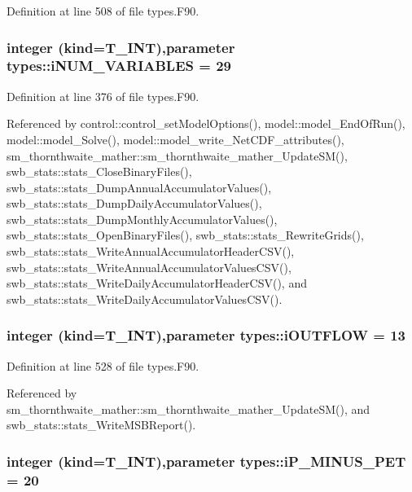 Definition at line 508 of file types.F90.

\hypertarget{namespacetypes_a9fd35718050c56c63e14d03fb07b62b3}{
\subsubsection[{iNUM\_\-VARIABLES}]{\setlength{\rightskip}{0pt plus 5cm}integer (kind={\bf T\_\-INT}),parameter {\bf types::iNUM\_\-VARIABLES} = 29}}
\label{namespacetypes_a9fd35718050c56c63e14d03fb07b62b3}


Definition at line 376 of file types.F90.



Referenced by control::control\_\-setModelOptions(), model::model\_\-EndOfRun(), model::model\_\-Solve(), model::model\_\-write\_\-NetCDF\_\-attributes(), sm\_\-thornthwaite\_\-mather::sm\_\-thornthwaite\_\-mather\_\-UpdateSM(), swb\_\-stats::stats\_\-CloseBinaryFiles(), swb\_\-stats::stats\_\-DumpAnnualAccumulatorValues(), swb\_\-stats::stats\_\-DumpDailyAccumulatorValues(), swb\_\-stats::stats\_\-DumpMonthlyAccumulatorValues(), swb\_\-stats::stats\_\-OpenBinaryFiles(), swb\_\-stats::stats\_\-RewriteGrids(), swb\_\-stats::stats\_\-WriteAnnualAccumulatorHeaderCSV(), swb\_\-stats::stats\_\-WriteAnnualAccumulatorValuesCSV(), swb\_\-stats::stats\_\-WriteDailyAccumulatorHeaderCSV(), and swb\_\-stats::stats\_\-WriteDailyAccumulatorValuesCSV().

\hypertarget{namespacetypes_ad2090785f42112bf8cf46d637279bc2c}{
\subsubsection[{iOUTFLOW}]{\setlength{\rightskip}{0pt plus 5cm}integer (kind={\bf T\_\-INT}),parameter {\bf types::iOUTFLOW} = 13}}
\label{namespacetypes_ad2090785f42112bf8cf46d637279bc2c}


Definition at line 528 of file types.F90.



Referenced by sm\_\-thornthwaite\_\-mather::sm\_\-thornthwaite\_\-mather\_\-UpdateSM(), and swb\_\-stats::stats\_\-WriteMSBReport().

\hypertarget{namespacetypes_adbfd806dc2d35d39c7984aa32d3a9bed}{
\subsubsection[{iP\_\-MINUS\_\-PET}]{\setlength{\rightskip}{0pt plus 5cm}integer (kind={\bf T\_\-INT}),parameter {\bf types::iP\_\-MINUS\_\-PET} = 20}}
\label{namespacetypes_adbfd806dc2d35d39c7984aa32d3a9bed}


